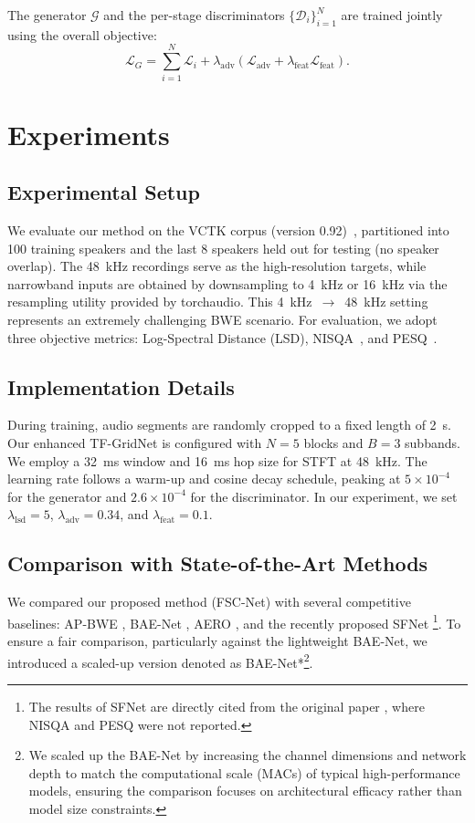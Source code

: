 \documentclass[journal]{IEEEtran}
\begin{document}
The generator $\mathcal{G}$ and the per-stage discriminators $\{\mathcal{D}_{i}\}_{i=1}^{N}$ are trained jointly using the overall objective:
\vspace{-0.1cm}
\begin{equation}
    \mathcal{L}_{G} = \sum_{i=1}^{N} \mathcal{L}_i + \lambda_{\mathrm{adv}} (\mathcal{L}_{\mathrm{adv}} + \lambda_{\mathrm{feat}} \mathcal{L}_{\mathrm{feat}}).
\end{equation}
\vspace{-0.2cm}
\section{Experiments}

\subsection{Experimental Setup}
We evaluate our method on the VCTK corpus (version 0.92)~\cite{vctk}, partitioned into 100 training speakers and the last 8 speakers held out for testing (no speaker overlap). The 48~kHz recordings serve as the high-resolution targets, while narrowband inputs are obtained by downsampling to 4~kHz or 16~kHz via the resampling utility provided by torchaudio. This 4~kHz~$\to$~48~kHz setting represents an extremely challenging BWE scenario. For evaluation, we adopt three objective metrics: Log-Spectral Distance (LSD), NISQA~\cite{NISQA}, and PESQ~\cite{PESQ}.

\subsection{Implementation Details}
During training, audio segments are randomly cropped to a fixed length of 2~s. Our enhanced TF-GridNet is configured with $N=5$ blocks and $B=3$ subbands. We employ a 32~ms window and 16~ms hop size for STFT at 48~kHz. The learning rate follows a warm-up and cosine decay schedule, peaking at $5 \times 10^{-4}$ for the generator and $2.6 \times 10^{-4}$ for the discriminator. In our experiment, we set $\lambda_{\mathrm{lsd}} = 5$, $\lambda_{\mathrm{adv}} = 0.34$, and $\lambda_{\mathrm{feat}} = 0.1$.

\subsection{Comparison with State-of-the-Art Methods}
We compared our proposed method (FSC-Net) with several competitive baselines: AP-BWE \cite{AP-BWE}, BAE-Net \cite{baenet}, AERO \cite{aero}, and the recently proposed SFNet \cite{dai2025sfnet}\footnote{The results of SFNet are directly cited from the original paper \cite{dai2025sfnet}, where NISQA and PESQ were not reported.}. To ensure a fair comparison, particularly against the lightweight BAE-Net, we introduced a scaled-up version denoted as BAE-Net*\footnote{We scaled up the BAE-Net by increasing the channel dimensions and network depth to match the computational scale (MACs) of typical high-performance models, ensuring the comparison focuses on architectural efficacy rather than model size constraints.}.
\end{document}
